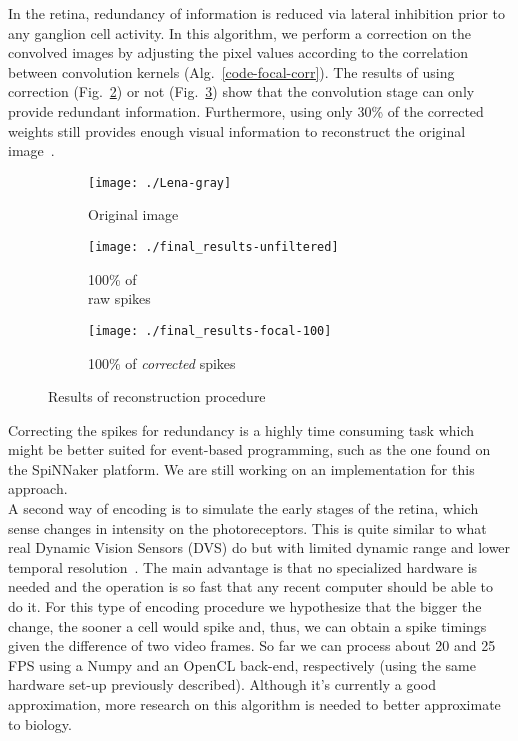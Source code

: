 In the retina, redundancy of information is reduced via lateral inhibition 
prior to any ganglion cell activity. In this algorithm, we perform a correction 
on the convolved images by adjusting the pixel values
according to the correlation between convolution kernels 
(Alg.~\ref{code-focal-corr}). The results of using correction 
(Fig.~\ref{pic-unfiltered-spikes}) or not (Fig.~\ref{pic-100pc-spikes}) show 
that the convolution stage can only provide redundant information. Furthermore, 
using only 30\% of the corrected weights still provides enough visual 
information to reconstruct the original image~\cite{basab-model}.

\begin{figure}
  \centering
  \begin{subfigure}[t]{0.15\textwidth}
    \centering
    \captionsetup{justification=centering,margin=0.1cm}
    \texttt{[image: ./Lena-gray]}
    \caption{Original image}
    \label{pic-original-lena}
  \end{subfigure}
  \begin{subfigure}[t]{0.15\textwidth}
    \centering
    \captionsetup{justification=centering,margin=0.1cm}
    \texttt{[image: ./final\_results-unfiltered]}
    \caption{100\% of \\raw spikes}
    \label{pic-unfiltered-spikes}
  \end{subfigure}
  \begin{subfigure}[t]{0.15\textwidth}
    \centering
    \captionsetup{justification=centering,margin=0.1cm}
    \texttt{[image: ./final\_results-focal-100]}
    \caption{100\% of \emph{corrected} spikes}
    \label{pic-100pc-spikes}
  \end{subfigure}
  \caption{Results of reconstruction procedure}
  \label{fig-reconstruction}
  \vspace*{-10pt}
\end{figure}
Correcting the spikes for redundancy is a highly time consuming task which
might be better suited for event-based programming, such as the one found on 
the SpiNNaker platform. We are still working on an implementation for this 
approach.\\

A second way of encoding is to simulate the early stages of the retina, which 
sense changes in intensity on the photoreceptors. This is quite similar to what 
real Dynamic Vision Sensors (DVS) do but with limited dynamic range and lower 
temporal resolution~\cite{aer-retina-bernabe,dvs-zurich}. The main advantage is 
that no specialized hardware is needed and the operation is so fast that any 
recent computer should be able to do it. For this type of encoding procedure we 
hypothesize that the bigger the change, the sooner a cell would spike and, 
thus, we can obtain a spike timings given the difference of two video frames. 
So far we can process about 20 and 25 FPS using a Numpy and an OpenCL back-end, 
respectively (using the same hardware set-up previously described). Although 
it's currently a good approximation, more research on this algorithm is needed 
to better approximate to biology. 
